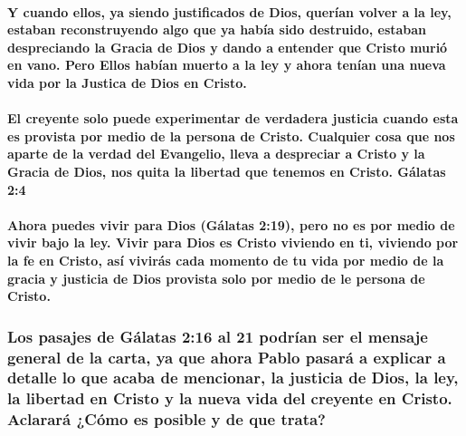 \documentclass[11a pt,twoside]{article}
\let\oldsubsubsection\subsubsection
\renewcommand{\subsubsection}{\needspace{4\baselineskip}\oldsubsubsection}
\let\oldparagraph\paragraph
\renewcommand{\paragraph}{\needspace{3\baselineskip}\oldparagraph}
\begin{document}
\paragraph{Y cuando ellos, ya siendo justificados de Dios, querían
volver a la ley, estaban reconstruyendo algo que ya había sido
destruido, estaban despreciando la Gracia de Dios y dando a entender que
Cristo murió en vano. Pero Ellos habían muerto a la ley y ahora tenían
una nueva vida por la Justica de Dios en
Cristo.}\label{y-cuando-ellos-ya-siendo-justificados-de-dios-queruxedan-volver-a-la-ley-estaban-reconstruyendo-algo-que-ya-habuxeda-sido-destruido-estaban-despreciando-la-gracia-de-dios-y-dando-a-entender-que-cristo-muriuxf3-en-vano.-pero-ellos-habuxedan-muerto-a-la-ley-y-ahora-tenuxedan-una-nueva-vida-por-la-justica-de-dios-en-cristo.}

\paragraph{El creyente solo puede experimentar de verdadera justicia
cuando esta es provista por medio de la persona de Cristo. Cualquier
cosa que nos aparte de la verdad del Evangelio, lleva a despreciar a
Cristo y la Gracia de Dios, nos quita la libertad que tenemos en Cristo.
Gálatas
2:4}\label{el-creyente-solo-puede-experimentar-de-verdadera-justicia-cuando-esta-es-provista-por-medio-de-la-persona-de-cristo.-cualquier-cosa-que-nos-aparte-de-la-verdad-del-evangelio-lleva-a-despreciar-a-cristo-y-la-gracia-de-dios-nos-quita-la-libertad-que-tenemos-en-cristo.-guxe1latas-24}

\paragraph{Ahora puedes vivir para Dios (Gálatas 2:19), pero no es por
medio de vivir bajo la ley. Vivir para Dios es Cristo viviendo en ti,
viviendo por la fe en Cristo, así vivirás cada momento de tu vida por
medio de la gracia y justicia de Dios provista solo por medio de le
persona de
Cristo.}\label{ahora-puedes-vivir-para-dios-guxe1latas-219-pero-no-es-por-medio-de-vivir-bajo-la-ley.-vivir-para-dios-es-cristo-viviendo-en-ti-viviendo-por-la-fe-en-cristo-asuxed-viviruxe1s-cada-momento-de-tu-vida-por-medio-de-la-gracia-y-justicia-de-dios-provista-solo-por-medio-de-le-persona-de-cristo.}

\subsubsection{Los pasajes de Gálatas 2:16 al 21 podrían ser el mensaje
general de la carta, ya que ahora Pablo pasará a explicar a detalle lo
que acaba de mencionar, la justicia de Dios, la ley, la libertad en
Cristo y la nueva vida del creyente en Cristo. Aclarará ¿Cómo es posible
y de que
trata?}\label{los-pasajes-de-guxe1latas-216-al-21-podruxedan-ser-el-mensaje-general-de-la-carta-ya-que-ahora-pablo-pasaruxe1-a-explicar-a-detalle-lo-que-acaba-de-mencionar-la-justicia-de-dios-la-ley-la-libertad-en-cristo-y-la-nueva-vida-del-creyente-en-cristo.-aclararuxe1-cuxf3mo-es-posible-y-de-que-trata}
\end{document}
